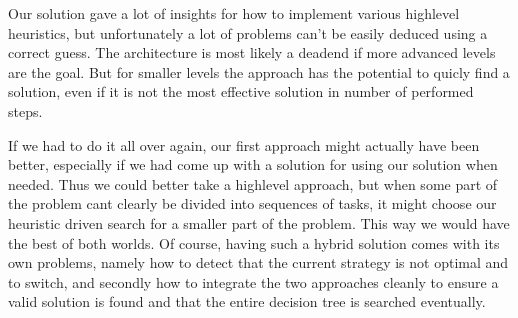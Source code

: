 \documentclass[letterpaper]{article}
\begin{document}
Our solution gave a lot of insights for how to implement various highlevel
heuristics, but unfortunately a lot of problems can't be easily deduced using a
correct guess. The architecture is most likely a deadend if more advanced levels
are the goal. But for smaller levels the approach has the potential to quicly
find a solution, even if it is not the most effective solution in number of
performed steps.

If we had to do it all over again, our first approach might actually have been
better, especially if we had come up with a solution for using our solution when
needed. Thus we could better take a highlevel approach, but when some part of
the problem cant clearly be divided into sequences of tasks, it might choose our
heuristic driven search for a smaller part of the problem. This way we would
have the best of both worlds. Of course, having such a hybrid solution comes
with its own problems, namely how to detect that the current strategy is not
optimal and to switch, and secondly how to integrate the two approaches cleanly
to ensure a valid solution is found and that the entire decision tree is searched eventually.




\end{document}
